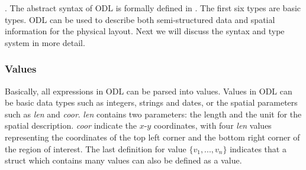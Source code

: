 .
The abstract syntax of ODL is formally defined in .
The first six types are basic types. 
ODL can be used to describe both semi-structured data and 
spatial information for the physical layout. Next we 
will discuss the 
syntax and type system in more detail. 

\subsubsection{Values}



Basically, all expressions in ODL can be parsed into values. Values 
in ODL can be basic data types such as integers, strings and dates, 
or the spatial parameters such as {\em len} and {\em coor}. 
{\em len} contains two parameters: the  
length and the unit for the spatial description. {\em coor} 
indicate  the $x$-$y$ coordinates, with four {\em len} values representing 
the coordinates of the top left corner and the bottom right corner of 
the region of interest. The last definition for value  {\em $\{v_1, ..., v_n\}$} indicates that a struct which contains many values can also be defined as a value. 

